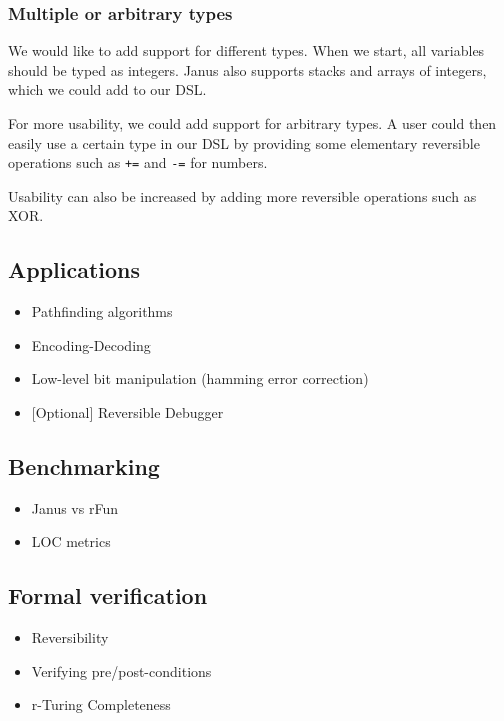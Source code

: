 \documentclass[12pt,a4paper]{article}
\begin{document}
	\subsubsection{Multiple or arbitrary types}
	We would like to add support for different types. When we start, all variables should be typed as integers. Janus also supports stacks and arrays of integers, which we could add to our DSL.
	
	For more usability, we could add support for arbitrary types. A user could then easily use a certain type in our DSL by providing some elementary reversible operations such as \texttt{+=} and \texttt{-=} for numbers.
	
	Usability can also be increased by adding more reversible operations such as XOR.

	\subsection{Applications}
	\begin{itemize}
		\item{Pathfinding algorithms}
        \item{Encoding-Decoding}
        \item{Low-level bit manipulation (hamming error correction)}
        \item{[Optional] Reversible Debugger}
	\end{itemize}
	
	\subsection{Benchmarking}
	\begin{itemize}
		\item{Janus vs rFun}
		\item{LOC metrics}
	\end{itemize}
	
	\subsection{Formal verification}
	\begin{itemize}
		\item{Reversibility}
		\item{Verifying pre/post-conditions}
		\item{r-Turing Completeness}
	\end{itemize}
\end{document}
